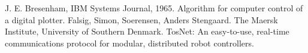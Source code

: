 \begin{thebibliography}{11}

		J. E. Bresenham, IBM Systems Journal, 1965. Algorithm for computer control of a digital plotter.
		Falsig, Simon, Soerensen, Anders Stengaard. The Maersk Institute, University of Southern Denmark. TosNet: An easy-to-use, real-time communications protocol for modular, distributed robot controllers.
	
\end{thebibliography}
